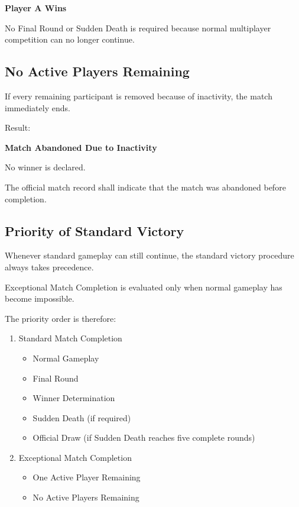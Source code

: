 \documentclass[11pt,a4paper]{article}
\begin{document}
\begin{center}
\Large\textbf{Player A Wins}
\end{center}

No Final Round or Sudden Death is required because normal multiplayer competition can no longer continue.

\subsection{No Active Players Remaining}

If every remaining participant is removed because of inactivity, the match immediately ends.

Result:

\begin{center}
\Large\textbf{Match Abandoned Due to Inactivity}
\end{center}

No winner is declared.

The official match record shall indicate that the match was abandoned before completion.

\subsection{Priority of Standard Victory}

Whenever standard gameplay can still continue, the standard victory procedure always takes precedence.

Exceptional Match Completion is evaluated only when normal gameplay has become impossible.

The priority order is therefore:

\begin{enumerate}
    \item Standard Match Completion
    \begin{itemize}
        \item Normal Gameplay
        \item Final Round
        \item Winner Determination
        \item Sudden Death (if required)
        \item Official Draw (if Sudden Death reaches five complete rounds)
    \end{itemize}

    \item Exceptional Match Completion
    \begin{itemize}
        \item One Active Player Remaining
        \item No Active Players Remaining
    \end{itemize}
\end{enumerate}
\end{document}
